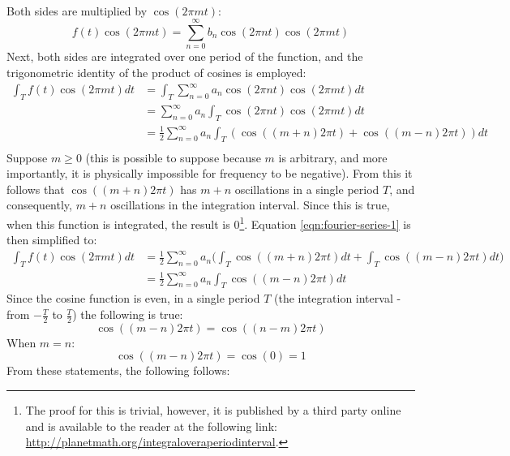 \documentclass{article}
\begin{document}
\paragraph*{}
Both sides are multiplied by $\cos(2 \pi m t)$:
$$f(t) \cos(2 \pi m t) = \sum^{\infty}_{n=0}b_n \cos(2 \pi n t) \cos(2 \pi m t)$$
Next, both sides are integrated over one period of the function, and the 
trigonometric identity of the product of cosines is employed:
\begin{equation}
	\begin{aligned}
		\int_{T} f(t) \cos(2 \pi m t) dt &= 
		\int_{T} \sum^{\infty}_{n=0} a_n \cos(2 \pi n t) \cos(2 \pi m t) dt \\
		&= \sum^{\infty}_{n=0} a_n \int_{T} \cos(2 \pi n t) \cos(2 \pi m t) dt \\
		&= \frac{1}{2} \sum^{\infty}_{n=0} a_n \int_{T} (\cos( (m + n) 2 \pi t) + \cos( (m - n) 2 \pi t)) dt \\
	\end{aligned}
	\label{eqn:fourier-series-1}
\end{equation}
Suppose $m \geq 0$ (this is possible to suppose because $m$ is arbitrary, and 
more importantly, it is physically impossible for frequency to be negative). 
From this it follows that $\cos( (m + n) 2 \pi t)$ has $m + n$ oscillations 
in a single period $T$, and consequently, $m + n$ oscillations in the 
integration interval. Since this is true, when this function is integrated, 
the result is $0$\footnote{The proof for this is trivial, however, it is 
published by a third party online and is available to the reader at the 
following link: \url{http://planetmath.org/integraloveraperiodinterval}.}. 
Equation \ref{eqn:fourier-series-1} is then simplified to:
\begin{equation}
	\begin{aligned}
		\int_{T} f(t) \cos(2 \pi m t) dt &=
		\frac{1}{2} \sum^{\infty}_{n=0} a_n \bigg(\int_{T} \cos( (m + n) 2 \pi t) dt + 
		\int_{T} \cos( (m - n) 2 \pi t) dt \bigg) \\
		&= \frac{1}{2} \sum^{\infty}_{n=0} a_n \int_{T} \cos( (m - n) 2 \pi t) dt
	\end{aligned}
	\label{eqn:fourier-series-2}
\end{equation}
Since the cosine function is even, in a single period $T$ (the integration 
interval - from $-\frac{T}{2}$ to $\frac{T}{2}$) the following is true:
$$\cos( (m - n) 2 \pi t) = \cos( (n - m) 2 \pi t)$$
When $m = n$:
$$\cos( (m - n) 2 \pi t) = \cos(0) = 1$$
From these statements, the following follows:
\end{document}
